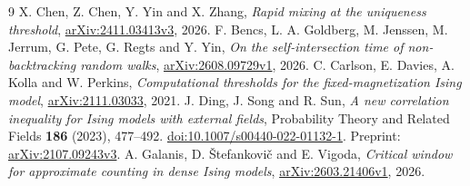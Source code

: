 \documentclass[11pt]{article}
\theoremstyle{remark}
\begin{document}
\begin{thebibliography}{9}
X. Chen, Z. Chen, Y. Yin and X. Zhang,
\emph{Rapid mixing at the uniqueness threshold},
\href{https://arxiv.org/abs/2411.03413v3}{arXiv:2411.03413v3}, 2026.
F. Bencs, L. A. Goldberg, M. Jenssen, M. Jerrum, G. Pete, G. Regts and Y. Yin,
\emph{On the self-intersection time of non-backtracking random walks},
\href{https://arxiv.org/abs/2608.09729v1}{arXiv:2608.09729v1}, 2026.
C. Carlson, E. Davies, A. Kolla and W. Perkins,
\emph{Computational thresholds for the fixed-magnetization Ising model},
\href{https://arxiv.org/abs/2111.03033}{arXiv:2111.03033}, 2021.
J. Ding, J. Song and R. Sun,
\emph{A new correlation inequality for Ising models with external fields},
Probability Theory and Related Fields \textbf{186} (2023), 477--492.
\href{https://doi.org/10.1007/s00440-022-01132-1}{doi:10.1007/s00440-022-01132-1}.
Preprint: \href{https://arxiv.org/abs/2107.09243v3}{arXiv:2107.09243v3}.
A. Galanis, D. \v{S}tefankovi\v{c} and E. Vigoda,
\emph{Critical window for approximate counting in dense Ising models},
\href{https://arxiv.org/abs/2603.21406v1}{arXiv:2603.21406v1}, 2026.
\end{thebibliography}
\end{document}
